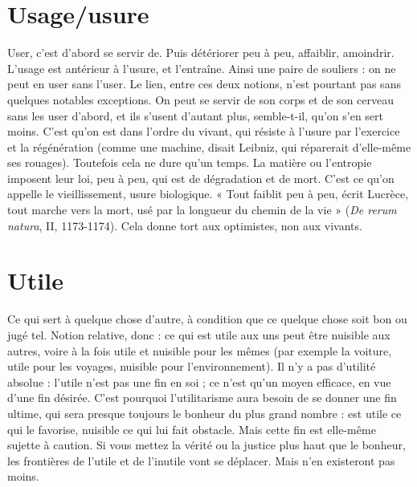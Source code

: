 \section{Usage/usure}
User, c’est d’abord se servir de. Puis détériorer peu à peu,
affaiblir, amoindrir. L'usage est antérieur à l’usure, et l’entraîne.
Ainsi une paire de souliers : on ne peut en user sans l’user. Le lien, entre
ces deux notions, n’est pourtant pas sans quelques notables exceptions. On
peut se servir de son corps et de son cerveau sans les user d’abord, et ils s’usent
d'autant plus, semble-t-il, qu’on s’en sert moins. C’est qu’on est dans l’ordre du
vivant, qui résiste à l’usure par l’exercice et la régénération (comme une
machine, disait Leibniz, qui réparerait d’elle-même ses rouages). Toutefois cela
ne dure qu’un temps. La matière ou l’entropie imposent leur loi, peu à peu, qui
est de dégradation et de mort. C’est ce qu’on appelle le vieillissement, usure
biologique. « Tout faiblit peu à peu, écrit Lucrèce, tout marche vers la mort,
usé par la longueur du chemin de la vie » ({\it De rerum natura}, II, 1173-1174).
Cela donne tort aux optimistes, non aux vivants.

\section{Utile}
Ce qui sert à quelque chose d’autre, à condition que ce quelque
chose soit bon ou jugé tel. Notion relative, donc : ce qui est utile
aux uns peut être nuisible aux autres, voire à la fois utile et nuisible pour les
mêmes (par exemple la voiture, utile pour les voyages, nuisible pour l’environnement).
Il n’y a pas d’utilité absolue : l’utile n’est pas une fin en soi ; ce n’est
qu'un moyen efficace, en vue d’une fin désirée. C’est pourquoi l’utilitarisme
aura besoin de se donner une fin ultime, qui sera presque toujours le bonheur
du plus grand nombre : est utile ce qui le favorise, nuisible ce qui lui fait obstacle.
Mais cette fin est elle-même sujette à caution. Si vous mettez la vérité ou
la justice plus haut que le bonheur, les frontières de l’utile et de l’inutile vont
se déplacer. Mais n’en existeront pas moins.

